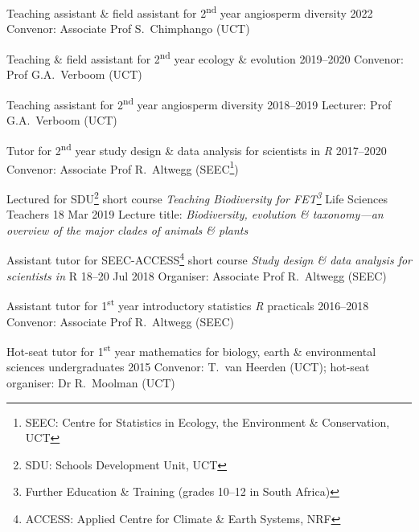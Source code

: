 \documentclass[10pt]{article}
\begin{document}
\begin{hangparas}{2em}{1}

Teaching assistant \& field assistant for 2\textsuperscript{nd} year angiosperm
diversity                                                     \hfill 2022 \break
Convenor: Associate Prof S.~Chimphango (UCT)

Teaching \& field assistant for 2\textsuperscript{nd} year ecology \& evolution
                                                        \hfill 2019--2020 \break
Convenor: Prof G.A.~Verboom (UCT)

Teaching assistant for 2\textsuperscript{nd} year angiosperm diversity
                                                        \hfill 2018--2019 \break
Lecturer: Prof G.A.~Verboom (UCT)

Tutor for 2\textsuperscript{nd} year study design \& data analysis for 
scientists in \textit{R}                                \hfill 2017--2020 \break
Convenor: Associate Prof R.~Altwegg (SEEC\footnote{SEEC: Centre for 
Statistics in Ecology, the Environment \& Conservation, UCT})

Lectured for SDU\footnote{SDU: Schools Development Unit, UCT} short course 
\textit{Teaching Biodiversity for FET\footnote{Further Education \& Training
(grades 10--12 in South Africa)}} Life Sciences Teachers
                                                       \hfill 18 Mar 2019 \break
Lecture title: \textit{Biodiversity, evolution \& taxonomy---an overview of the 
major clades of animals \& plants}

Assistant tutor for SEEC-ACCESS\footnote{ACCESS: Applied Centre for Climate \&
Earth Systems, NRF} short course \textit{Study design \& data analysis for 
scientists in} R                                   \hfill 18--20 Jul 2018 \break
Organiser: Associate Prof R.~Altwegg (SEEC)

Assistant tutor for 1\textsuperscript{st} year introductory statistics
\textit{R} practicals                                   \hfill 2016--2018 \break
Convenor: Associate Prof R.~Altwegg (SEEC)

Hot-seat tutor for 1\textsuperscript{st} year mathematics for biology, earth \& 
environmental sciences undergraduates                         \hfill 2015 \break
Convenor: T.~van Heerden (UCT); hot-seat organiser: Dr R.~Moolman (UCT)

\hfill

\end{hangparas}
\end{document}
